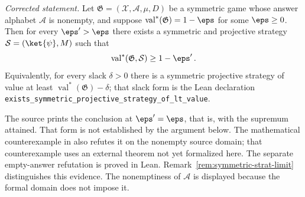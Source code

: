\begin{lemma}\label{lem:symmetric-strat}
	\leanok
	\emph{Corrected statement.} Let $\mathfrak G = (\mathcal X, \mathcal A, \mu, D)$ be a symmetric game whose answer alphabet $\mathcal A$ is nonempty, and suppose $\operatorname{val}^*(\mathfrak G) = 1-\eps$ for some $\eps \ge 0$. Then for every $\eps' > \eps$ there exists a symmetric and projective strategy $\mathcal S = (\ket{\psi}, M)$ such that
	\[
		\operatorname{val}^*(\mathfrak G, \mathcal S) \ge 1-\eps'\,.
	\]
	Equivalently, for every slack $\delta > 0$ there is a symmetric projective strategy of value at least $\operatorname{val}^*(\mathfrak G) - \delta$; that slack form is the Lean declaration \texttt{exists\_symmetric\_projective\_strategy\_of\_lt\_value}.

	The source prints the conclusion at $\eps' = \eps$, that is, with the supremum attained. That form is not established by the argument below. The mathematical counterexample in \cite{gap:qpbt_symmetrization-attainment} also refutes it on the nonempty source domain; that counterexample uses an external theorem not yet formalized here. The separate empty-answer refutation is proved in Lean. Remark~\ref{rem:symmetric-strat-limit} distinguishes this evidence. The nonemptiness of $\mathcal A$ is displayed because the formal domain does not impose it.
\end{lemma}
